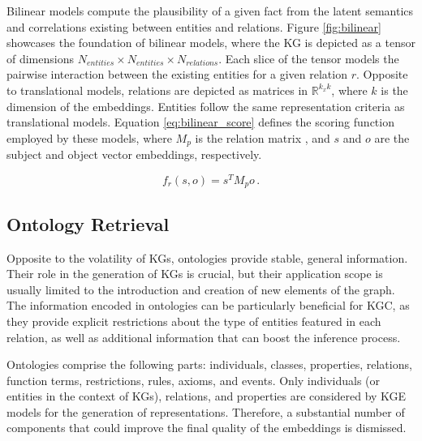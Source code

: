 Bilinear models compute the plausibility of a given fact from the latent semantics and correlations existing between entities and relations. Figure \ref{fig:bilinear} showcases the foundation of bilinear models, where the KG is depicted as a tensor of dimensions $N_{entities} \times N_{entities} \times N_{relations}$. Each slice of the tensor models the pairwise interaction between the existing entities for a given relation $r$. Opposite to translational models, relations are depicted as matrices in $\mathbb{R}^{k_x k}$, where $k$ is the dimension of the embeddings. Entities follow the same representation criteria as translational models. Equation \ref{eq:bilinear_score} defines the scoring function employed by these models, where $M_p$ is the relation matrix , and $s$ and $o$ are the subject and object vector embeddings, respectively.

\begin{equation}\label{eq:bilinear_score}
    f_r(s,o)=s^T M_p o \,.
\end{equation}





\subsection{Ontology Retrieval} \label{subsec:s4_onto_retrieval}
Opposite to the volatility of KGs, ontologies provide stable, general information. Their role in the generation of KGs is crucial, but their application scope is usually limited to the introduction and creation of new elements of the graph. The information encoded in ontologies can be particularly beneficial for KGC, as they provide explicit restrictions about the type of entities featured in each relation, as well as additional information that can boost the inference process.

Ontologies comprise the following parts: individuals, classes, properties, relations, function terms, restrictions, rules, axioms, and events. Only individuals (or entities in the context of KGs), relations, and properties are considered by KGE models for the generation of representations. Therefore, a substantial number of components that could improve the final quality of the embeddings is dismissed.

